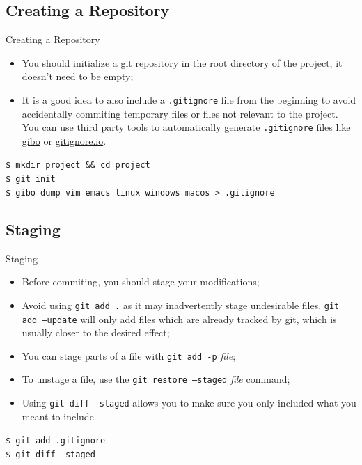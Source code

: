 \documentclass{beamer}
\begin{document}
\subsection{Creating a Repository}
\begin{frame}{Creating a Repository}
  \begin{itemize}
    \item You should initialize a git repository in the root directory of the project, it doesn't need to be empty;
    \item It is a good idea to also include a \texttt{.gitignore} file from the beginning to avoid accidentally commiting temporary files or files not relevant to the project. You can use third party tools to automatically generate \texttt{.gitignore} files like \href{https://github.com/simonwhitaker/gibo}{gibo} or \href{https://www.toptal.com/developers/gitignore/}{gitignore.io}.
  \end{itemize}
  \begin{block}{}
    \texttt{\$ mkdir project \&\& cd project} \\
    \texttt{\$ git init} \\
    \texttt{\$ gibo dump vim emacs linux windows macos > .gitignore}
  \end{block}
\end{frame}

\subsection{Staging}
\begin{frame}{Staging}
  \begin{itemize}
    \item Before commiting, you should stage your modifications;
    \item Avoid using \texttt{git add .} as it may inadvertently stage undesirable files. \texttt{git add --update} will only add files which are already tracked by git, which is usually closer to the desired effect;
    \item You can stage parts of a file with \texttt{git add -p} \textit{file};
    \item To unstage a file, use the \texttt{git restore --staged} \textit{file} command;
    \item Using \texttt{git diff --staged} allows you to make sure you only included what you meant to include.
  \end{itemize}
  \begin{block}{}
    \texttt{\$ git add .gitignore} \\
    \texttt{\$ git diff --staged}
  \end{block}
\end{frame}
\end{document}
